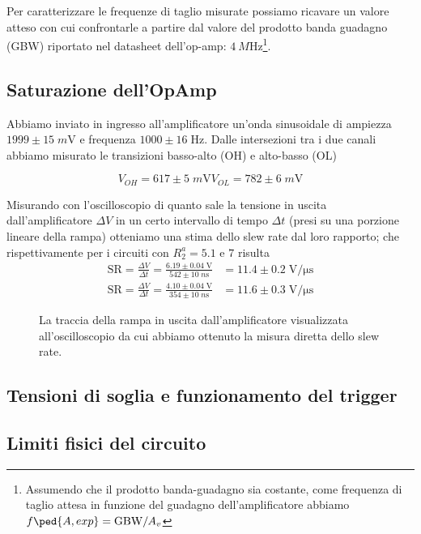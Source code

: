 \documentclass[10pt,a4paper]{article}
\begin{document}
Per caratterizzare le frequenze di taglio misurate possiamo ricavare un valore
atteso con cui confrontarle a partire dal valore del prodotto banda guadagno
(GBW) riportato nel datasheet dell'op-amp: $\SI{4}{M\Hz}$\footnote{Assumendo
che il prodotto banda-guadagno sia costante, come frequenza di taglio
attesa in funzione del guadagno dell'amplificatore abbiamo
$f\ped{A, exp} = \mathrm{GBW}/A_v$}.

\subsection{Saturazione dell'OpAmp}
Abbiamo inviato in ingresso all'amplificatore un'onda sinusoidale di ampiezza
$1999 \pm 15 \; \si{m\V}$ e frequenza $1000 \pm 16 \; \si{\Hz}$.
Dalle intersezioni tra i due canali abbiamo misurato le transizioni basso-alto
(OH) e alto-basso (OL)

\[
V_{OH} = 617 \pm 5 \; \si{m\V}
V_{OL} = 782 \pm 6 \; \si{m\V}
\]

Misurando con l'oscilloscopio di quanto sale la tensione in uscita
dall'amplificatore $\Delta V$ in un certo intervallo di tempo $\Delta t$
(presi su una porzione lineare della rampa) otteniamo una stima dello slew
rate dal loro rapporto; che rispettivamente per i circuiti con $R_2^a = 5.1$
e $7$ risulta
\begin{align*}
\mathrm{SR} = \frac{\Delta V}{\Delta t} =
\frac{6.19 \pm 0.04 \; \si{\V}}{542 \pm 10 \; \si{n\s}}
&= 11.4 \pm 0.2 \; \si{\V/\micro\s} \\
\mathrm{SR} = \frac{\Delta V}{\Delta t} =
\frac{4.10 \pm 0.04 \; \si{\V}}{354 \pm 10 \; \si{n\s}}
&= 11.6 \pm 0.3 \; \si{\V/\micro\s}  
\end{align*}

\begin{figure}[htbp]
\centering
\caption{La traccia della rampa in uscita dall'amplificatore visualizzata
all'oscilloscopio da cui abbiamo ottenuto la misura diretta dello slew rate.
\label{fig: slewrate}}
\end{figure}

\subsection{Tensioni di soglia e funzionamento del trigger}

\subsection{Limiti fisici del circuito}
\end{document}
